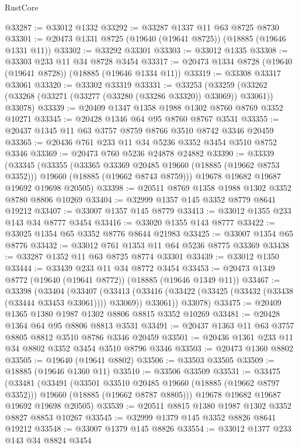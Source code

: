 \begin{lexlean}{RustCore}
\begin{coremodule}
@33287 := @33012 @1332
@33292 := @33287 @1337 @11 @63 @8725 @8730
@33301 := @20473 @1331 @8725 (@19640 (@19641 @8725)) (@18885 (@19646 @1331 @11))
@33302 := @33292 @33301
@33303 := @33012 @1335
@33308 := @33303 @233 @11 @34 @8728 @3454
@33317 := @20473 @1334 @8728 (@19640 (@19641 @8728)) (@18885 (@19646 @1334 @11))
@33319 := @33308 @33317 @33061
@33320 := @33302 @33319
@33331 := @33253
    (@33259 (@33262 (@33268 (@33271 (@33277 (@33280 (@33286 @33320)) @33069)) @33061)) @33078)
@33339 := @20409 @1347 @1358 @1988 @1302 @8760 @8769 @3352 @10271
@33345 := @20428 @1346 @64 @95 @8760 @8767 @3531
@33355 := @20437 @1345 @11 @63 @3757 @8759 @8766 @3510 @8742 @3346 @20459
@33365 := @20436 @761 @233 @11 @34 @5236 @3352 @3454 @3510 @8752 @3346
@33369 := @20473 @760 @5236 @24878 @24882
@33390 := @33339
    (@33345
      (@33355
        (@33365 @33369 @20485 @19660 (@18885 (@19662 @8753 @3352)))
        @19660
        (@18885 (@19662 @8743 @8759)))
      @19678
      @19682
      @19687
      @19692
      @19698
      @20505)
@33398 := @20511 @8769 @1358 @1988 @1302 @3352 @8780 @8806 @10269
@33404 := @32999 @1357 @145 @3352 @8779 @8641 @19212
@33407 := @33007 @1357 @145 @8779
@33413 := @33012 @1355 @233 @143 @34 @8777 @3454
@33416 := @33020 @1355 @143 @8777
@33422 := @33025 @1354 @65 @3352 @8776 @8644 @21983
@33425 := @33007 @1354 @65 @8776
@33432 := @33012 @761 @1353 @11 @64 @5236 @8775 @33369
@33438 := @33287 @1352 @11 @63 @8725 @8774 @33301
@33439 := @33012 @1350
@33444 := @33439 @233 @11 @34 @8772 @3454
@33453 := @20473 @1349 @8772 (@19640 (@19641 @8772)) (@18885 (@19646 @1349 @11))
@33467 := @33398
    (@33404
      (@33407
        (@33413 (@33416 (@33422 (@33425 (@33432 (@33438 (@33444 @33453 @33061)))) @33069)) @33061))
      @33078)
@33475 := @20409 @1365 @1380 @1987 @1302 @8806 @8815 @3352 @10269
@33481 := @20428 @1364 @64 @95 @8806 @8813 @3531
@33491 := @20437 @1363 @11 @63 @3757 @8805 @8812 @3510 @8786 @3346 @20459
@33501 := @20436 @1361 @233 @11 @34 @8802 @3352 @3454 @3510 @8796 @3346
@33503 := @20473 @1360 @8802
@33505 := @19640 (@19641 @8802)
@33506 := @33503 @33505
@33509 := @18885 (@19646 @1360 @11)
@33510 := @33506 @33509
@33531 := @33475
    (@33481
      (@33491
        (@33501 @33510 @20485 @19660 (@18885 (@19662 @8797 @3352)))
        @19660
        (@18885 (@19662 @8787 @8805)))
      @19678
      @19682
      @19687
      @19692
      @19698
      @20505)
@33539 := @20511 @8815 @1380 @1987 @1302 @3352 @8827 @8853 @10267
@33545 := @32999 @1379 @145 @3352 @8826 @8641 @19212
@33548 := @33007 @1379 @145 @8826
@33554 := @33012 @1377 @233 @143 @34 @8824 @3454

\end{coremodule}
\end{lexlean}
